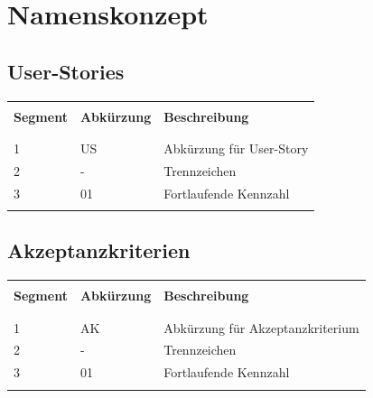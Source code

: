 \section{Namenskonzept}
\subsection{User-Stories}
\begin{table}[H]
  \begin{tabularx}{\textwidth}{l l X}\hline \\
  \textbf{Segment} & \textbf{Abkürzung} & \textbf{Beschreibung} \\ \\\hline \\
  1 & US & Abkürzung für User-Story \\
  2 & - & Trennzeichen \\
  3 & 01 & Fortlaufende Kennzahl \\
  \\\hline
  \end{tabularx}
\end{table}
\subsection{Akzeptanzkriterien}
\begin{table}[H]
  \begin{tabularx}{\textwidth}{l l X}\hline \\
    \textbf{Segment} & \textbf{Abkürzung} & \textbf{Beschreibung} \\ \\\hline \\
    1 & AK & Abkürzung für Akzeptanzkriterium \\
    2 & - & Trennzeichen \\
    3 & 01 & Fortlaufende Kennzahl \\
    \\\hline
  \end{tabularx}
\end{table}
